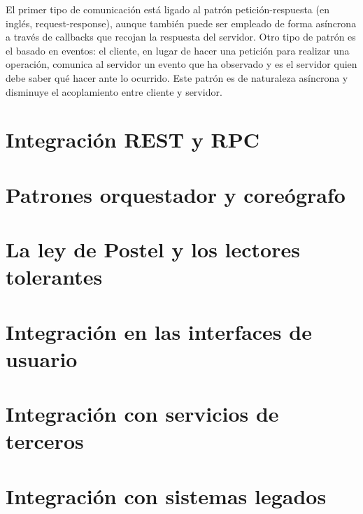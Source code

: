 \documentclass[11pt,a4paper]{article}
\begin{document}
El primer tipo de comunicación está ligado al patrón petición-respuesta (en inglés, request-response), aunque también puede ser empleado de forma asíncrona a través de callbacks que recojan la respuesta del servidor. Otro tipo de patrón es el basado en eventos: el cliente, en lugar de hacer una petición para realizar una operación, comunica al servidor un evento que ha observado y es el servidor quien debe saber qué hacer ante lo ocurrido. Este patrón es de naturaleza asíncrona y disminuye el acoplamiento entre cliente y servidor.

\section{Integración REST y RPC}

\section{Patrones orquestador y coreógrafo}

\section{La ley de Postel y los lectores tolerantes}

\section{Integración en las interfaces de usuario}

\section{Integración con servicios de terceros}

\section{Integración con sistemas legados}
\end{document}
